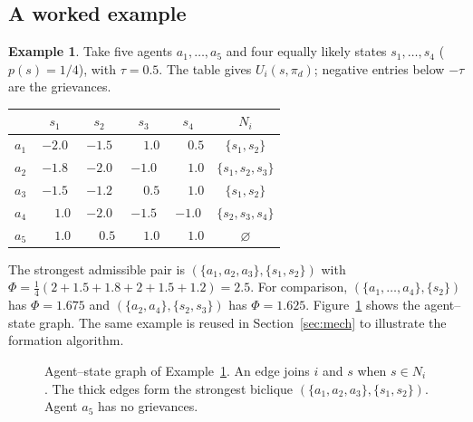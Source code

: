 \documentclass[11pt]{article}
\theoremstyle{plain}
\theoremstyle{definition}
\newtheorem{example}[theorem]{Example}
\theoremstyle{remark}
\begin{document}
\subsection{A worked example}
\begin{example}\label{ex:toy}
Take five agents $a_1,\dots,a_5$ and four equally likely states $s_1,\dots,s_4$ ($p(s)=1/4$), with $\tau = 0.5$.
The table gives $U_i(s,\pi_d)$; negative entries below $-\tau$ are the grievances.
\begin{center}
\small
\begin{tabular}{@{}c cccc c@{}}
\toprule
 & $s_1$ & $s_2$ & $s_3$ & $s_4$ & $N_i$ \\
\midrule
$a_1$ & $-2.0$ & $-1.5$ & $\phantom{-}1.0$ & $\phantom{-}0.5$ & $\{s_1,s_2\}$ \\
$a_2$ & $-1.8$ & $-2.0$ & $-1.0$ & $\phantom{-}1.0$ & $\{s_1,s_2,s_3\}$ \\
$a_3$ & $-1.5$ & $-1.2$ & $\phantom{-}0.5$ & $\phantom{-}1.0$ & $\{s_1,s_2\}$ \\
$a_4$ & $\phantom{-}1.0$ & $-2.0$ & $-1.5$ & $-1.0$ & $\{s_2,s_3,s_4\}$ \\
$a_5$ & $\phantom{-}1.0$ & $\phantom{-}0.5$ & $\phantom{-}1.0$ & $\phantom{-}1.0$ & $\varnothing$ \\
\bottomrule
\end{tabular}
\end{center}
The strongest admissible pair is $(\{a_1,a_2,a_3\},\{s_1,s_2\})$ with $\Phi = \tfrac14(2+1.5+1.8+2+1.5+1.2)=2.5$.
For comparison, $(\{a_1,\dots,a_4\},\{s_2\})$ has $\Phi=1.675$ and $(\{a_2,a_4\},\{s_2,s_3\})$ has $\Phi=1.625$.
Figure~\ref{fig:toy} shows the agent--state graph. The same example is reused in Section~\ref{sec:mech} to illustrate the formation algorithm.
\end{example}
 
\begin{figure}[!ht]
\centering
{}
\caption{Agent--state graph of Example~\ref{ex:toy}. An edge joins $i$ and $s$ when $s\in N_i$.
The thick edges form the strongest biclique $(\{a_1,a_2,a_3\},\{s_1,s_2\})$. Agent $a_5$ has no grievances.}
\label{fig:toy}
\end{figure}
 
\end{document}
